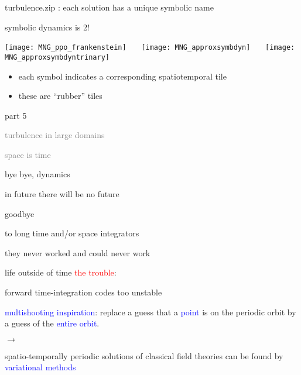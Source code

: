 \begin{frame}{turbulence.zip : each solution has a unique symbolic name}
  \begin{block} {symbolic dynamics is 2\dmn!}
  \begin{center}
  \texttt{[image: MNG\_ppo\_frankenstein]}
~~~\texttt{[image: MNG\_approxsymbdyn]}
~~~\texttt{[image: MNG\_approxsymbdyntrinary]}
  \end{center}
  \end{block}
\begin{itemize}
 \item each symbol indicates a corresponding spatiotemporal tile
 \item these are ``rubber'' tiles
\end{itemize}
\end{frame}

\begin{frame}{part 5}
\begin{enumerate}
              \item
    \textcolor{gray}{\small
turbulence in large domains
              \item
space is time
    }
              \item
    {\Large
bye bye, dynamics
    }
            \end{enumerate}
\end{frame}

\begin{frame}{in future there will be no future}
\begin{center}
{\huge goodbye}
\end{center}

\vfill

to long time and/or space integrators
\medskip

\hfill they never worked and could never work
\end{frame}

\begin{frame}{life outside of time}
\textcolor{red}{the trouble}:

forward time-integration codes too unstable
\bigskip
\bigskip

\textcolor{blue}{multishooting inspiration}:
 replace a guess that a  \textcolor{blue}{point} is on the periodic
orbit by a guess of the \textcolor{blue}{entire orbit}.
\bigskip

$\to$
\bigskip

spatio-temporally periodic solutions of classical field theories
can be found by \textcolor{blue}{variational methods}
\end{frame}

